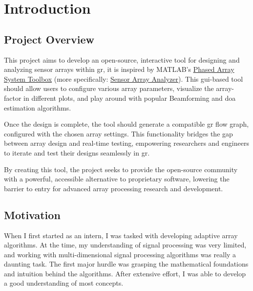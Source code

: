 \chapter{Introduction} \label{ch: introduction}

\section{Project Overview}

This project aims to develop an open-source, interactive tool for designing and analyzing sensor arrays within \acf{gr}, it is inspired by MATLAB’s \href{https://in.mathworks.com/products/phased-array.html}{Phased Array System Toolbox} (more specifically: \href{https://in.mathworks.com/help/phased/ref/sensorarrayanalyzer-app.html}{Sensor Array Analyzer}). This \acs{gui}-based tool should allow users to configure various array parameters, visualize the array-factor in different plots, and play around with popular Beamforming and \acf{doa} estimation algorithms.

Once the design is complete, the tool should generate a compatible \ac{gr} flow graph, configured with the chosen array settings. This functionality bridges the gap between array design and real-time testing, empowering researchers and engineers to iterate and test their designs seamlessly in \ac{gr}.

By creating this tool, the project seeks to provide the open-source community with a powerful, accessible alternative to proprietary software, lowering the barrier to entry for advanced array processing research and development.
	
\section{Motivation}

When I first started as an intern, I was tasked with developing adaptive array algorithms. At the time, my understanding of signal processing was very limited, and working with multi-dimensional signal processing algorithms was really a daunting task. The first major hurdle was grasping the mathematical foundations and intuition behind the algorithms. After extensive effort, I was able to develop a good understanding of most concepts.

